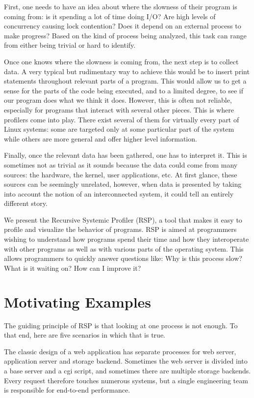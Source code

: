 \documentclass[10pt]{article}
\begin{document}
First, one needs to have an idea about where the slowness of their program is
coming from: is it spending a lot of time doing I/O? Are high levels of
concurrency causing lock contention? Does it depend on an external process to
make progress? Based on the kind of process being analyzed, this task can range
from either being trivial or hard to identify.

Once one knows where the slowness is coming from, the next step is to collect
data. A very typical but rudimentary way to achieve this would be to insert print
statements throughout relevant parts of a program. This would allow us to get a
sense for the parts of the code being executed, and to a limited degree, to see
if our program does what we think it does. However, this is often not reliable,
especially for programs that interact with several other pieces. This is where
profilers come into play. There exist several of them for virtually every part of
Linux systems: some are targeted only at some particular part of the system while
others are more general and offer higher level information.

Finally, once the relevant data has been gathered, one has to interpret it. This
is sometimes not as trivial as it sounds because the data could come from many
sources: the hardware, the kernel, user applications, etc. At first glance, these
sources can be seemingly unrelated, however, when data is  presented by taking
into account the notion of an interconnected system, it could tell an entirely
different story.

We present the Recursive Systemic Profiler (RSP), a tool that makes it easy to
profile and visualize the behavior of programs. RSP is aimed at programmers
wishing to understand how programs spend their time and how they interoperate
with other programs as well as with various parts of the operating system. This
allows programmers to quickly answer questions like: Why is this process slow?
What is it waiting on? How can I improve it?

\section{Motivating Examples}

The guiding principle of RSP is that looking at one process is not
enough. To that end, here are five scenarios in which that is true.

The classic design of a web application has separate processes for web server,
application server and storage backend. Sometimes the web server is divided
into a base server and a cgi script, and sometimes there are multiple storage
backends. Every request therefore touches numerous systems, but a single
engineering team is responsible for end-to-end performance.
\end{document}
